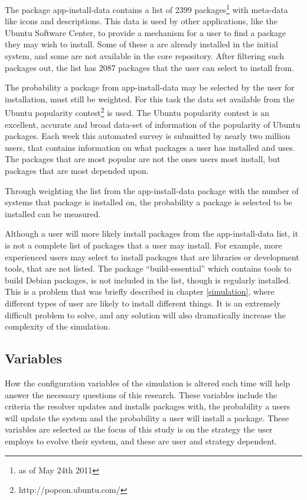 The package app-install-data contains a list of 2399 packages\footnote{as of May 24th 2011} with meta-data like icons and descriptions.
This data is used by other applications, like the Ubuntu Software Center, to provide a mechanism for a user to find a package they may wish to install.
Some of these a are already installed in the initial system, and some are not available in the core repository.
After filtering such packages out, the list has 2087 packages that the user can select to install from. 

The probability a package from app-install-data may be selected by the user for installation, must still be weighted.
For this task the data set available from the Ubuntu popularity contest\footnote{http://popcon.ubuntu.com/} is used.
The Ubuntu popularity contest is an excellent, accurate and broad data-set of information of the popularity of Ubuntu packages.
Each week this automated survey is submitted by nearly two million users, that contains information on what packages a user has installed and uses.
The packages that are most popular are not the ones users most install, but packages that are most depended upon.

Through weighting the list from the app-install-data package with the number of systems that package is installed on,
the probability a package is selected to be installed can be measured.

Although a user will more likely install packages from the app-install-data list, it is not a complete list of packages that a user may install. 
For example, more experienced users may select to install packages that are libraries or development tools, that are not listed.
The package ``build-essential'' which contains tools to build Debian packages, is not included in the list, though is regularly installed.
This is a problem that was briefly described in chapter \ref{simulation}, where different types of user are likely to install different things.
It is an extremely difficult problem to solve, and any solution will also dramatically increase the complexity of the simulation.

\subsection{Variables}
How the configuration variables of the simulation is altered each time will help answer the necessary questions of this research.
These variables include the criteria the resolver updates and installs packages with,
the probability a users will update the system and the probability a user will install a package.
These variables are selected as the focus of this study is on the strategy the user employs to evolve their system,
and these are user and strategy dependent.

